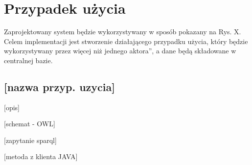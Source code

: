 \section{Przypadek użycia}
\label{cha:przyp}

Zaprojektowany system będzie wykorzystywany w sposób pokazany na Rys. X. Celem implementacji jest stworzenie działającego przypadku użycia, który będzie wykorzystywany przez więcej niż jednego  \quotedblbase aktora\textquotedblright, a dane będą składowane w centralnej bazie.

\subsection{[nazwa przyp. uzycia]}
\label{cha:przyp1}

[opis]

[schemat - OWL]

[zapytanie sparql]

[metoda z klienta JAVA]